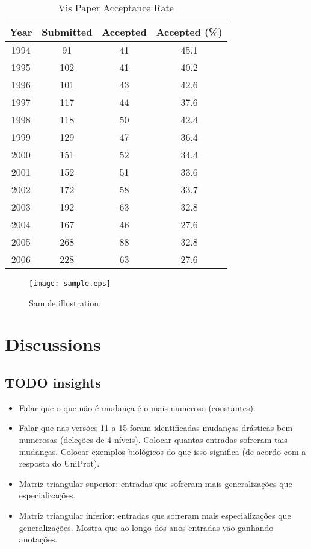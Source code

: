 \documentclass{vgtc}                          %
\begin{document}
\begin{table}[!h]
  \caption{Vis Paper Acceptance Rate}
  \label{vis_accept}
  \scriptsize
  \begin{center}
    \begin{tabular}{cccc}
      Year & Submitted & Accepted & Accepted (\%)\\
    \hline
      1994 &  91 & 41 & 45.1\\
      1995 & 102 & 41 & 40.2\\
      1996 & 101 & 43 & 42.6\\
      1997 & 117 & 44 & 37.6\\
      1998 & 118 & 50 & 42.4\\
      1999 & 129 & 47 & 36.4\\
      2000 & 151 & 52 & 34.4\\
      2001 & 152 & 51 & 33.6\\
      2002 & 172 & 58 & 33.7\\
      2003 & 192 & 63 & 32.8\\
      2004 & 167 & 46 & 27.6\\
      2005 & 268 & 88 & 32.8\\
      2006 & 228 & 63 & 27.6
    \end{tabular}
  \end{center}
\end{table}

\begin{figure}[htb]
  \centering
  \texttt{[image: sample.eps]}
  \caption{Sample illustration.}
\end{figure}

\section{Discussions}

\subsection{TODO insights}

\begin{itemize}


\item Falar que o que não é mudança é o mais numeroso (constantes).

\item Falar que nas versões 11 a 15 foram identificadas mudanças drásticas bem numerosas (deleções de 4 níveis). Colocar quantas entradas sofreram tais mudanças. Colocar exemplos biológicos do que isso significa (de acordo com a resposta do UniProt).

\item Matriz triangular superior: entradas que sofreram mais generalizações que especializações.

\item Matriz triangular inferior: entradas que sofreram mais especializações que generalizações. Mostra que ao longo dos anos entradas vão ganhando anotações.

\end{itemize}
\end{document}
